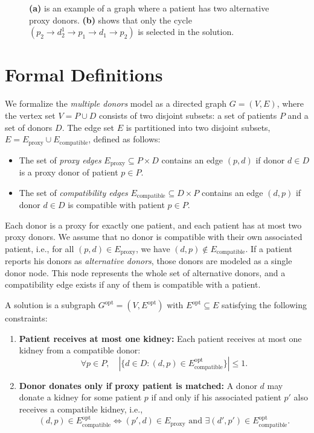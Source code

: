 \begin{figure}[htbp]
\begin{minipage}[t]{0.48\textwidth}
    \caption[An example of a graph with a patient having two alternative donors]{\textbf{(a)} is an example of a graph where a patient has two alternative proxy donors. \textbf{(b)} shows that only the cycle $(p_2 \rightarrow d_2^1 \rightarrow p_1 \rightarrow d_1 \rightarrow p_2)$ is selected in the solution.}
    \label{fig:alternative_model_example}
  \end{minipage}
\end{figure}

\section{Formal Definitions}

We formalize the \textit{multiple donors} model as a directed graph $G = (V, E)$, where the vertex set $V = P \cup D$ consists of two disjoint subsets: a set of patients $P$ and a set of donors $D$. The edge set $E$ is partitioned into two disjoint subsets, $E = E_{\mathrm{proxy}} \cup E_{\mathrm{compatible}}$, defined as follows:
\begin{itemize}
    \item The set of \textit{proxy edges} $E_{\mathrm{proxy}} \subseteq P \times D$ contains an edge $(p, d)$ if donor $d \in D$ is a proxy donor of patient $p \in P$.
    \item The set of \textit{compatibility edges} $E_{\mathrm{compatible}} \subseteq D \times P$ contains an edge $(d, p)$ if donor $d \in D$ is compatible with patient $p \in P$.
\end{itemize}

Each donor is a proxy for exactly one patient, and each patient has at most two proxy donors. We assume that no donor is compatible with their own associated patient, i.e., for all $(p, d) \in E_{\mathrm{proxy}}$, we have $(d, p) \notin E_{\mathrm{compatible}}$. If a patient reports his donors as \textit{alternative donors}, those donors are modeled as a single donor node. This node represents the whole set of alternative donors, and a compatibility edge exists if any of them is compatible with a patient.

A solution is a subgraph $G^{\mathrm{opt}} = (V, E^{\mathrm{opt}})$ with $E^{\mathrm{opt}} \subseteq E$ satisfying the following constraints:
\begin{enumerate}
    \item \textbf{Patient receives at most one kidney:}  
    Each patient receives at most one kidney from a compatible donor:  
    \[
        \forall p \in P, \quad \left| \{ d \in D : (d, p) \in E^{\mathrm{opt}}_{\mathrm{compatible}} \} \right| \le 1.
    \]
    \item \textbf{Donor donates only if proxy patient is matched:}  
    A donor $d$ may donate a kidney for some patient $p$ if and only if his associated patient $p'$ also receives a compatible kidney, i.e.,  
    \[
        (d, p) \in E^{\mathrm{opt}}_{\mathrm{compatible}} \iff (p', d) \in E_{\mathrm{proxy}} \text{ and } \exists (d', p') \in E^{\mathrm{opt}}_{\mathrm{compatible}}.
    \]
\end{enumerate}

